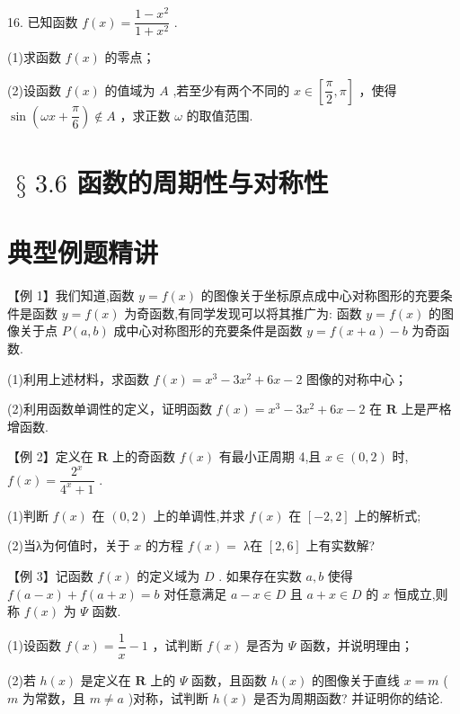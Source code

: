16. 已知函数 $f\left( x\right)  = \dfrac{1 - {x}^{2}}{1 + {x}^{2}}$ .

(1)求函数 $f\left( x\right)$ 的零点；

(2)设函数 $f\left( x\right)$ 的值域为 $A$ ,若至少有两个不同的 $x \in  \left\lbrack  {\dfrac{\pi }{2},\pi }\right\rbrack$ ，使得 $\sin \left( {{\omega x} + \dfrac{\pi }{6}}\right)  \notin  A$ ，求正数 $\omega$ 的取值范围.

\section*{$\text{ § }{3.6}$ 函数的周期性与对称性}

\section*{典型例题精讲}

【例 1】我们知道,函数 $y = f\left( x\right)$ 的图像关于坐标原点成中心对称图形的充要条件是函数 $y = f\left( x\right)$ 为奇函数,有同学发现可以将其推广为: 函数 $y = f\left( x\right)$ 的图像关于点 $P\left( {a,b}\right)$ 成中心对称图形的充要条件是函数 $y = f\left( {x + a}\right)  - b$ 为奇函数.

(1)利用上述材料，求函数 $f\left( x\right)  = {x}^{3} - 3{x}^{2} + {6x} - 2$ 图像的对称中心；

(2)利用函数单调性的定义，证明函数 $f\left( x\right)  = {x}^{3} - 3{x}^{2} + {6x} - 2$ 在 $\mathbf{R}$ 上是严格增函数.

【例 2】定义在 $\mathbf{R}$ 上的奇函数 $f\left( x\right)$ 有最小正周期 4,且 $x \in  \left( {0,2}\right)$ 时, $f\left( x\right)  = \dfrac{{2}^{x}}{{4}^{x} + 1}$ .

(1)判断 $f\left( x\right)$ 在 $\left( {0,2}\right)$ 上的单调性,并求 $f\left( x\right)$ 在 $\left\lbrack  {-2,2}\right\rbrack$ 上的解析式;

(2)当λ为何值时，关于 $x$ 的方程 $f\left( x\right)  =$ λ在 $\left\lbrack  {2,6}\right\rbrack$ 上有实数解?

【例 3】记函数 $f\left( x\right)$ 的定义域为 $D$ . 如果存在实数 $a,b$ 使得 $f\left( {a - x}\right)  + f\left( {a + x}\right)  = b$ 对任意满足 $a - x \in  D$ 且 $a + x \in  D$ 的 $x$ 恒成立,则称 $f\left( x\right)$ 为 $\Psi$ 函数.

(1)设函数 $f\left( x\right)  = \dfrac{1}{x} - 1$ ，试判断 $f\left( x\right)$ 是否为 $\Psi$ 函数，并说明理由；

(2)若 $h\left( x\right)$ 是定义在 $\mathbf{R}$ 上的 $\Psi$ 函数，且函数 $h\left( x\right)$ 的图像关于直线 $x = m$ ( $m$ 为常数，且 $m \neq  a$ )对称，试判断 $h\left( x\right)$ 是否为周期函数? 并证明你的结论.

